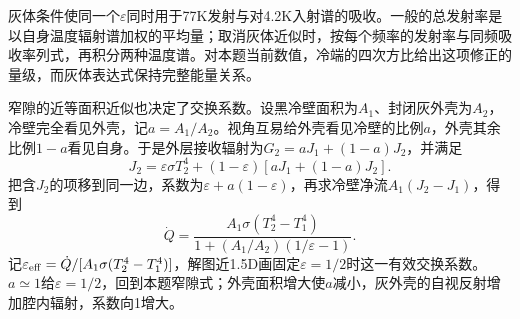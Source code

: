 \documentclass[UTF8,fontset=fandol,a4paper,11pt]{ctexart}
\begin{document}
灰体条件使同一个$\varepsilon$同时用于77K发射与对4.2K入射谱的吸收。一般的总发射率是以自身温度辐射谱加权的平均量；取消灰体近似时，按每个频率的发射率与同频吸收率列式，再积分两种温度谱。对本题当前数值，冷端的四次方比给出这项修正的量级，而灰体表达式保持完整能量关系。

窄隙的近等面积近似也决定了交换系数。设黑冷壁面积为$A_1$、封闭灰外壳为$A_2$，冷壁完全看见外壳，记$a=A_1/A_2$。视角互易给外壳看见冷壁的比例$a$，外壳其余比例$1-a$看见自身。于是外层接收辐射为$G_2=aJ_1+(1-a)J_2$，并满足
\[
 J_2=\varepsilon\sigma T_2^4+(1-\varepsilon)
 [aJ_1+(1-a)J_2].
\]
把含$J_2$的项移到同一边，系数为$\varepsilon+a(1-\varepsilon)$，再求冷壁净流$A_1(J_2-J_1)$，得到
\[
\dot Q=\frac{A_1\sigma(T_2^4-T_1^4)}
{1+(A_1/A_2)(1/\varepsilon-1)}.
\]
记$\varepsilon_{\rm eff}=\dot Q/[A_1\sigma(T_2^4-T_1^4)]$，解图近1.5D画固定$\varepsilon=1/2$时这一有效交换系数。$a\simeq1$给$\varepsilon=1/2$，回到本题窄隙式；外壳面积增大使$a$减小，灰外壳的自视反射增加腔内辐射，系数向1增大。
\end{document}
